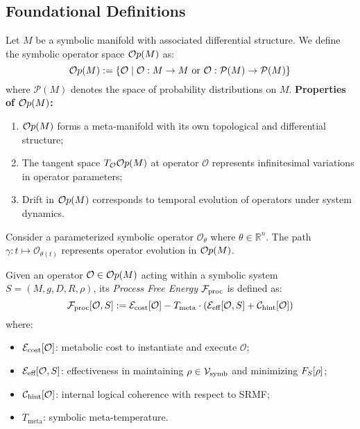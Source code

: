 \subsection*{Foundational Definitions}
\label{subsec:bk5_srmf_foundational_definitions}
\begin{definition} \label{def:bk5_symbolic_operator_space}
Let $M$ be a symbolic manifold with associated differential structure. We define the symbolic operator space $\mathcal{O}p(M)$ as:
\[
\mathcal{O}p(M) := \left\{ \mathcal{O} \mid \mathcal{O} : M \to M \ \text{or} \ \mathcal{O} : \mathcal{P}(M) \to \mathcal{P}(M) \right\}
\]
where $\mathcal{P}(M)$ denotes the space of probability distributions on $M$.
\textbf{Properties of $\mathcal{O}p(M)$:}
\begin{enumerate}
    \item $\mathcal{O}p(M)$ forms a meta-manifold with its own topological and differential structure;
    \item The tangent space $T_{\mathcal{O}}\mathcal{O}p(M)$ at operator $\mathcal{O}$ represents infinitesimal variations in operator parameters;
    \item Drift in $\mathcal{O}p(M)$ corresponds to temporal evolution of operators under system dynamics.
\end{enumerate}
\end{definition}
\begin{proposition}
\label{prop:bk5_operator_evolution}
Consider a parameterized symbolic operator $\mathcal{O}_{\theta}$ where $\theta \in \mathbb{R}^n$. The path $\gamma: t \mapsto \mathcal{O}_{\theta(t)}$ represents operator evolution in $\mathcal{O}p(M)$.
\end{proposition}
\begin{definition} \label{definition:bk5_process_free_energy}
Given an operator $\mathcal{O} \in \mathcal{O}p(M)$ acting within a symbolic system $S = (M, g, D, R, \rho)$, its \emph{Process Free Energy} $\mathcal{F}_{\text{proc}}$ is defined as:
\[
\mathcal{F}_{\text{proc}}[\mathcal{O}, S] := \mathcal{E}_{\text{cost}}[\mathcal{O}] - T_{\text{meta}} \cdot \left( \mathcal{E}_{\text{eff}}[\mathcal{O}, S] + \mathcal{C}_{\text{hint}}[\mathcal{O}] \right)
\]
where:
\begin{itemize}
    \item $\mathcal{E}_{\text{cost}}[\mathcal{O}]$: metabolic cost to instantiate and execute $\mathcal{O}$;
    \item $\mathcal{E}_{\text{eff}}[\mathcal{O}, S]$: effectiveness in maintaining $\rho \in \mathcal{V}_{\mathrm{symb}}$ and minimizing $F_S[\rho]$;
    \item $\mathcal{C}_{\text{hint}}[\mathcal{O}]$: internal logical coherence with respect to SRMF;
    \item $T_{\text{meta}}$: symbolic meta-temperature.
\end{itemize}
\end{definition}

